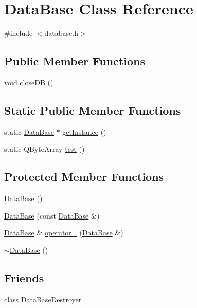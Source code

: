 \hypertarget{class_data_base}{}\section{Data\+Base Class Reference}
\label{class_data_base}


{\ttfamily \#include $<$database.\+h$>$}

\subsection*{Public Member Functions}
\begin{DoxyCompactItemize}
\item 
void \mbox{\hyperlink{class_data_base_adb17c56e22c3fe77bbd682bee8811a56}{close\+DB}} ()
\end{DoxyCompactItemize}
\subsection*{Static Public Member Functions}
\begin{DoxyCompactItemize}
\item 
static \mbox{\hyperlink{class_data_base}{Data\+Base}} $\ast$ \mbox{\hyperlink{class_data_base_abe2f75c0d6067414a1fbb22dc166ca46}{get\+Instance}} ()
\item 
static Q\+Byte\+Array \mbox{\hyperlink{class_data_base_a0f8839a75f6881d6b4a9e7d3eed0fb78}{test}} ()
\end{DoxyCompactItemize}
\subsection*{Protected Member Functions}
\begin{DoxyCompactItemize}
\item 
\mbox{\hyperlink{class_data_base_a9fbd4936704ce4de391f92e92a072074}{Data\+Base}} ()
\item 
\mbox{\hyperlink{class_data_base_aebdd1dfd170fef81ff0365609d63e533}{Data\+Base}} (const \mbox{\hyperlink{class_data_base}{Data\+Base}} \&)
\item 
\mbox{\hyperlink{class_data_base}{Data\+Base}} \& \mbox{\hyperlink{class_data_base_ac5c47c845425deafd990f249077297ab}{operator=}} (\mbox{\hyperlink{class_data_base}{Data\+Base}} \&)
\item 
\mbox{\hyperlink{class_data_base_a9d4629e705ccaa4897e9650222a2a648}{$\sim$\+Data\+Base}} ()
\end{DoxyCompactItemize}
\subsection*{Friends}
\begin{DoxyCompactItemize}
\item 
class \mbox{\hyperlink{class_data_base_a2de1189b514a6e1f7c31c180dc27f000}{Data\+Base\+Destroyer}}
\end{DoxyCompactItemize}


